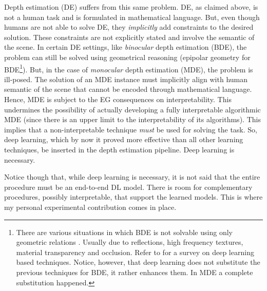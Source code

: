 Depth estimation (DE) suffers from this same problem.
DE, as claimed above, is not a human task and is formulated in mathematical language.
But, even though humans are not able to solve DE, they \textit{implicitly} add constraints to the desired solution.
These constraints are not explicitly stated and involve the semantic of the scene.
In certain DE settings, like \textit{binocular} depth estimation (BDE), the problem can still be solved using geometrical reasoning (epipolar geometry \cite{multiview} for BDE\footnote{
    There are various situations in which BDE is not solvable using only geometric relations \cite{correspondence}.
    Usually due to reflections, high frequency textures, material transparency and occlusion.
    Refer to \cite{stereo} for a survey on deep learning based techniques.
    Notice, however, that deep learning does not substitute the previous techniques for BDE, it rather enhances them.
    In MDE a complete substitution happened.
}).
But, in the case of \textit{monocular} depth estimation (MDE), the problem is ill-posed.
The solution of an MDE instance must implicitly align with human semantic of the scene that cannot be encoded through mathematical language.
Hence, MDE is subject to the EG consequences on interpretability.
This undermines the possibility of actually developing a fully interpretable algorithmic MDE (since there is an upper limit to the interpretability of its algorithms).
This implies that a non-interpretable technique \textit{must} be used for solving the task.
So, deep learning, which by now it proved more effective than all other learning techniques,  be inserted in the depth estimation pipeline.
Deep learning is necessary.

Notice though that, while deep learning is necessary, it is not said that the entire procedure must be an end-to-end DL model.
There is room for complementary procedures, possibly interpretable, that support the learned models.
This is where my personal experimental contribution comes in place.

